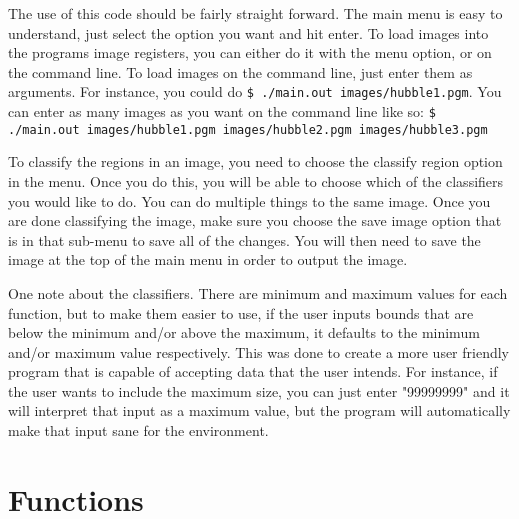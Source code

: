 \documentclass[pdftex, 12pt]{article}
\begin{document}
The use of this code should be fairly straight forward. The main menu is easy to understand, just select the option you
want and hit enter. To load images into the programs image registers, you can either do it with the menu option, or on
the command line. To load images on the command line, just enter them as arguments. For instance, you could do \texttt{\$
./main.out images/hubble1.pgm}. You can enter as many images as you want on the command line like so: \texttt{\$
./main.out images/hubble1.pgm images/hubble2.pgm images/hubble3.pgm}

To classify the regions in an image, you need to choose the classify region option in the menu. Once you do this, you
will be able to choose which of the classifiers you would like to do. You can do multiple things to the same image. Once
you are done classifying the image, make sure you choose the save image option that is in that sub-menu to save all of
the changes. You will then need to save the image at the top of the main menu in order to output the image. 

One note about the classifiers. There are minimum and maximum values for each function, but to make them easier to use,
if the user inputs bounds that are below the minimum and/or above the maximum, it defaults to the minimum and/or maximum
value respectively. This was done to create a more user friendly program that is capable of accepting data that the
user intends. For instance, if the user wants to include the maximum size, you can just enter "99999999" and it will
interpret that input as a maximum value, but the program will automatically make that input sane for the environment.


\section{Functions}

\end{document}
